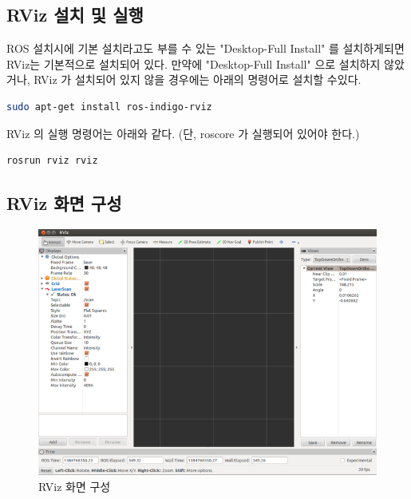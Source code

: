 \subsection{RViz 설치 및 실행}

ROS 설치시에 기본 설치라고도 부를 수 있는 "Desktop-Full Install" 를 설치하게되면 RViz는 기본적으로 설치되어 있다. 만약에 "Desktop-Full Install" 으로 설치하지 않았거나, RViz 가 설치되어 있지 않을 경우에는 아래의 명령어로 설치할 수있다.

\begin{lstlisting}[language=bash]
sudo apt-get install ros-indigo-rviz
\end{lstlisting}

\noindent
RViz 의 실행 명령어는 아래와 같다. (단, roscore 가 실행되어 있어야 한다.)

\begin{lstlisting}[language=bash]
rosrun rviz rviz
\end{lstlisting}

\subsection{RViz 화면 구성}

\begin{figure}[h]
\centering\includegraphics[width=0.8\columnwidth]{pictures/chapter6/rviz.png}
\caption{RViz 화면 구성}
\end{figure}

